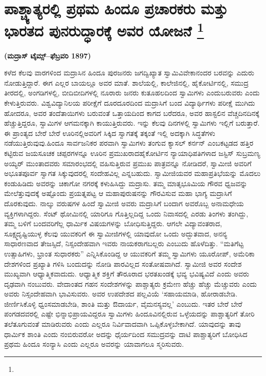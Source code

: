
\vspace{-0.7cm}

\chapter[ಪಾಶ್ಚ್ಯಾತ್ಯರಲ್ಲಿ ಪ್ರಥಮ ಹಿಂದೂ ಪ್ರಚಾರಕರು ಮತ್ತು ಭಾರತದ ಪುನರುದ್ಧಾರಕ್ಕೆ ಅವರ ಯೋಜನೆ ]{ಪಾಶ್ಚ್ಯಾತ್ಯರಲ್ಲಿ ಪ್ರಥಮ ಹಿಂದೂ ಪ್ರಚಾರಕರು ಮತ್ತು ಭಾರತದ ಪುನರುದ್ಧಾರಕ್ಕೆ ಅವರ ಯೋಜನೆ \protect\footnote{}}

\centerline{\textbf{(ಮದ್ರಾಸ್​ ಟೈಮ್ಸ್–ಫೆಬ್ರವರಿ 1897)}}

\vskip 0.2cm

ಕಳೆದ ಕೆಲವು ವಾರಗಳಿಂದ ಮದ್ರಾಸಿನ ಹಿಂದೂ ಪುರಜನರು ಜಗದ್ವಿಖ್ಯಾತ ಸ್ವಾಮಿ\break ವಿವೇಕಾನಂದರ ಬರವನ್ನು ಎದುರು ನೋಡುತ್ತಿದ್ದಾರೆ. ಈಗ ಎಲ್ಲರ ಬಾಯಲ್ಲೂ ಅವರ ಮಾತೆ. ಶಾಲೆಯಲ್ಲಿ, ಕಾಲೇಜಿನಲ್ಲಿ, ಹೈಕೋರ್ಟಿನಲ್ಲಿ, ಸಮುದ್ರ ತೀರದಲ್ಲಿ, ಅಂಗಡಿಗಳಲ್ಲಿ, ಬೀದಿಬೀದಿಗಳಲ್ಲಿ ನೂರಾರು ಜನರು ಕುತೂಹಲದಿಂದ ಸ್ವಾಮಿಗಳು ಎಂದು\break ಬರುವರು ಎಂದು ಕೇಳುತ್ತಿರುವರು. ವಿಶ್ವವಿದ್ಯಾನಿಲಯ ಪರೀಕ್ಷೆಗೆ ದೂರದೂರದಿಂದ ಮದ್ರಾಸಿಗೆ ಬಂದ ವಿದ್ಯಾರ್ಥಿಗಳು ಪರೀಕ್ಷೆ ಮುಗಿದು ಹೋದರೂ, ಅವರ ತಂದೆ\break ತಾಯಿಗಳು ಬರುವಂತೆ ಒತ್ತಾಯದಿಂದ ಕಾಗದ ಬರೆದರೂ, ಅವರ ಹಾಸ್ಟಲಿನ ವೆಚ್ಚ\break ದಿನದಿನಕ್ಕೆ ಹೆಚ್ಚುತ್ತಿದ್ದರೂ, ಸ್ವಾಮಿಗಳ ಆಗಮನಕ್ಕಾಗಿ ಕಾಯುತ್ತಿರುವರು. ಇನ್ನು ಕೆಲವು ದಿನಗಳಲ್ಲಿ ಸ್ವಾಮಿಗಳು ಇಲ್ಲಿಗೆ ಬರುತ್ತಾರೆ. ಈ ಪ್ರಾಂತ್ಯದ ಬೇರೆ ಬೇರೆ ಊರಿನಲ್ಲಿ\break ಅವರಿಗೆ ಸಿಕ್ಕಿದ ಸ್ವಾಗತಕ್ಕೆ ತಕ್ಕಂತೆ ಇಲ್ಲಿ ಅದಕ್ಕಾಗಿ ಸಿದ್ಧತೆಗಳು ನಡೆಯುತ್ತಿರುವುವು.\break ಹಿಂದೂ ಸಾರ್ವಜನಿಕರ ಪರವಾಗಿ ಸ್ವಾಮಿಗಳು ತಂಗುವ ಕ್ಯಾಸಲ್​ ಕರ್ನನ್​ ಎಂಬ\break ಕಟ್ಟಡದ ಹತ್ತಿರ ಕಟ್ಟಿರುವ ಜಯಸೂಚಕ ಚಪ್ಪರಗಳನ್ನೂ ಊರಿನ ಪ್ರಮುಖರಾದ\break ಹೈಕೋರ್ಟಿನ ನ್ಯಾಯಾಧಿಪತಿಗಳಾದ ಜಸ್ಟಿಸ್​ ಸುಬ್ರಮಣ್ಯ ಅಯ್ಯರ್​ ಮುಂತಾದವರು ಸಮಾರಂಭದಲ್ಲಿ ವಹಿಸುತ್ತಿರುವ ಪ್ರಮುಖ ಪಾತ್ರವನ್ನೂ ನೋಡಿದರೆ, ಸ್ವಾಮೀಜಿ ಅವರಿಗೆ ಅಭೂತಪೂರ್ವ ಸ್ವಾಗತ ಸಿಕ್ಕುವುದರಲ್ಲಿ ಸಂದೇಹವಿಲ್ಲ ಎನ್ನಬಹುದು. ಸ್ವಾಮೀಜಿಯವರ ಮಹಾಪ್ರತಿಭೆಯನ್ನು ಮೊದಲು ಕಂಡುಹಿಡಿದು ಅವರನ್ನು ಚಿಕಾಗೋ ನಗರಕ್ಕೆ ಕಳುಹಿಸಿದ್ದು ಮದ್ರಾಸು. ತಮ್ಮ ಮಾತೃಭೂಮಿಯ ಗೌರವ ಧ್ವಜವನ್ನು ಮೇಲೆತ್ತುವುದಕ್ಕೆ ಅಷ್ಟೊಂದು ಪ್ರಯತ್ನಪಟ್ಟ ಆ ಮಹಾಪುರುಷನನ್ನು ಗೌರವಿಸುವ ಮಹಾ ಭಾಗ್ಯ ಮದ್ರಾಸಿಗೆ ದೊರಕುವುದು. ನಾಲ್ಕು ವರುಷಗಳ ಹಿಂದೆ ಸ್ವಾಮೀಜಿ ಅವರು ಮದ್ರಾಸಿಗೆ ಬಂದಾಗ ಅವರೊಬ್ಬ ಅನಾಮಧೇಯ ವ್ಯಕ್ತಿಗಳಾಗಿದ್ದರು. ಸೆಂಟ್​ ಥೋಮಿನಲ್ಲಿ ಯಾರಿಗೂ ಗೊತ್ತಿಲ್ಲದಿದ್ದ ಒಂದು ನಿವಾಸದಲ್ಲಿ ಎರಡು ತಿಂಗಳು ತಂಗಿದ್ದು, ತಮ್ಮ ಬಳಿಗೆ ಬಂದವರಿಗೆಲ್ಲ ಧಾರ್ಮಿಕ ವಿಷಯಗಳನ್ನು ಬೋಧಿಸುತ್ತಿದ್ದರು. ಆಗಲೇ ವಿದ್ಯಾವಂತರಾದ, ಸೂಕ್ಷ್ಮದೃಷ್ಟಿಯುಳ್ಳ ಕೆಲವು ಯುವಕರಿಗೆ ಈ ಸ್ವಾಮೀಜಿಗಳಲ್ಲಿ ಯಾವುದೋ ಒಂದು ಅದ್ಭುತವಾದ, ಅನನ್ಯ ಸಾಧಾರಣವಾದ ತೇಜಸ್ಸಿದೆ, ನಿಸ್ಸಂದೇಹವಾಗಿ ಇವರು ನಾಯಕರಾಗಬಲ್ಲರು ಎಂಬುದು ಹೊಳೆದಿತ್ತು. “ಮತಿಗೆಟ್ಟ ಉತ್ಸಾಹಿಗಳು, ಭ್ರಾಂತ ಸುಧಾರಕರು” ಎನ್ನಿಸಿಕೊಂಡಿದ್ದ ಆ ಯುವಕರಿಗೆ ತಮ್ಮ ಸ್ವಾಮಿಗಳು ಯೂರೋಪ್​, ಅಮೆರಿಕಾ ದೇಶಗಳಿಂದ ಪ್ರಖ್ಯಾತಿ ಗಳಿಸಿ ಬಂದುದನ್ನು ನೋಡಿ ಪಾರವಿಲ್ಲದ ಸಂತೋಷವಾಗಿದೆ. ಸ್ವಾಮೀಜಿ ಅವರ ಸಂದೇಶ ಮುಖ್ಯವಾಗಿ ಆಧ್ಯಾತ್ಮಿಕವಾದುದು. ಆಧ್ಯಾತ್ಮಿಕ ಶಕ್ತಿಗೆ ತೌರೂರಾದ ಭರತಖಂಡಕ್ಕೆ ಭವ್ಯ ಭವಿಷ್ಯವಿದೆ ಎಂದು ಅವರು ದೃಢವಾಗಿ ನಂಬುವರು. ವೇದಾಂತದ ಗಹನ ಸಂದೇಶಗಳನ್ನು ಪಾಶ್ಚಾತ್ಯರು ಕ್ರಮೇಣ ಹೆಚ್ಚು ಹೆಚ್ಚು ಮೆಚ್ಚುವರು ಎಂದು ಅವರು ನಿಸ್ಸಂದೇಹವಾಗಿ ಭಾವಿಸುವರು. ಅವರ ಉಪದೇಶದ ಪಲ್ಲವಿಯೆ ‘ಸಹಾಯಮಾಡಿ, ಹೋರಾಡಬೇಡಿ. ಜೀರ್ಣಿಸಿಕೊಳ್ಳಿ ಧ್ವಂಸಮಾಡಬೇಡಿ, ಶಾಂತಿ ಮತ್ತು ಔದಾರ್ಯ, ವೈಮನಸ್ಯವಲ್ಲ’ ಎಂಬುದು. ಇತರ ಬೇರೆ ಬೇರೆ ಪಂಗಡದವರಲ್ಲಿ ಎಷ್ಟೇ ಭಿನ್ನಾಭಿಪ್ರಾಯವಿದ್ದರೂ ಸ್ವಾಮಿಗಳು ಹಿಂದೂವಿನಲ್ಲಿರುವ ಒಳ್ಳೆಯದನ್ನು ಪಾಶ್ಚಾತ್ಯರಿಗೆ ತೋರಿ ತಲೆತೂಗುವಂತೆ ಮಾಡಿರುವರು ಎಂದು ಎಲ್ಲರೂ ನಿರ್ವಿವಾದವಾಗಿ ಒಪ್ಪಿಕೊಳ್ಳಬೇಕಾಗಿದೆ. ಯಾವುದನ್ನು ತಾವು ಧಾರ್ಮಿಕ ಶಾಂತಿ ಎಂದು ನಂಬಿರುವರೋ ಅದನ್ನು ಧೈರ್ಯದಿಂದ ಸಮುದ್ರವನ್ನು ದಾಟಿ ಪಾಶ್ಚಾತ್ಯರಿಗೆ ಬೋಧಿಸಿದ ಪ್ರಥಮ ಹಿಂದೂ ಸಂನ್ಯಾಸಿ ಎಂದು ಎಲ್ಲರೂ ಅವರನ್ನು ಯಾವಾಗಲೂ ಸ್ಮರಿಸುವರು.

